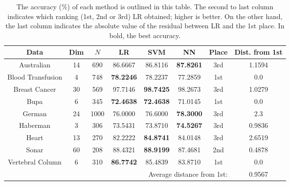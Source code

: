 \documentclass{INGUADY}
\begin{document}
\begin{table*}
\center
\caption{The accuracy (\%) of each method is outlined in this table. The second to last column indicates which ranking (1st, 2nd or 3rd) LR obtained; higher is better. On the other hand, the last column indicates the absolute value of the residual between LR and the 1st place. In bold, the best accuracy.} \vspace{3mm}
\setlength{\tabcolsep}{2mm}
\begin{tabular}{c|cc|ccc|cc}
\toprule
Data & Dim & $N$ & LR & SVM & NN & Place & Dist. from 1st \\
\midrule
\midrule
Australian 				& 14 	& 690  	& 86.6667 					& 86.8116 						& \textbf{87.8261} 	& 3rd 					&  1.1594 \\
Blood Transfusion 	& 4 		& 748 		& \textbf{78.2246} 	& 78.2237 						& 77.2859 					& 1st				 	& 0.0\\
Breast Cancer 			& 30 	& 569 		& 97.7146 					& \textbf{98.7425} 		& 98.2673 					& 3rd 					& 1.0279\\
Bupa 						& 6 		& 345 		& \textbf{72.4638} 	& \textbf{72.4638 }		& 71.0145 					& 1st 					& 0.0\\
German 					& 24 	& 1000 	& 76.0000 					& 76.6000 						& \textbf{78.3000} 	& 3rd 					& 2.3 \\
Haberman 				& 3 		& 306 		& 73.5431 					& 73.8710 						& \textbf{74.5267} 	& 3rd 					& 0.9836 \\
Heart 						& 13 	& 270 		& 82.2222 					& \textbf{84.8741}			& 84.0148 					& 3rd 					& 2.6519 \\
Sonar  						& 60 	& 208 		& 88.4321 					& \textbf{88.9199} 		& 87.4681 					& 2nd 					& 0.4878\\
Vertebral Column 	& 6 		& 310 		& \textbf{86.7742} 	& 85.4839 						& 83.8710 					& 1st 					& 0.0 \\
\midrule
 & & & & \multicolumn{3}{r}{Average distance from 1st:} 		& 0.9567 \\
\bottomrule
\end{tabular}
\label{tab:acc}
\end{table*}
\end{document}

